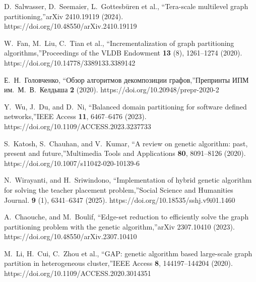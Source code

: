 \documentclass[
11pt,%
tightenlines,%
twoside,%
onecolumn,%
nofloats,%
nobibnotes,%
nofootinbib,%
superscriptaddress,%
noshowpacs,%
centertags]%
{revtex4}
\begin{document}
\begin{thebibliography}{99}
D.~Salwasser, D.~Seemaier, L.~Gottesb\"uren et al., \textquotedblleft Tera-scale multilevel graph partitioning,\textquotedblright arXiv 2410.19119 (2024). https://doi.org/10.48550/arXiv.2410.19119

W.~Fan, M.~Liu, C.~Tian et al., \textquotedblleft Incrementalization of graph partitioning algorithms,\textquotedblright Proceedings of the VLDB Endowment \textbf{13} (8), 1261--1274 (2020). https://doi.org/10.14778/3389133.3389142

Е.~Н.~Головченко, \textquotedblleft Обзор алгоритмов декомпозиции графов,\textquotedblright Препринты ИПМ им.~М.~В.~Келдыша \textbf{2} (2020). https://doi.org/10.20948/prepr-2020-2

Y.~Wu, J.~Du, and D.~Ni, \textquotedblleft Balanced domain partitioning for software defined networks,\textquotedblright IEEE Access \textbf{11}, 6467--6476 (2023). https://doi.org/10.1109/ACCESS.2023.3237733

S.~Katosh, S.~Chauhan, and V.~Kumar, \textquotedblleft A review on genetic algorithm: past, present and future,\textquotedblright Multimedia Tools and Applications \textbf{80}, 8091--8126 (2020). https://doi.org/10.1007/s11042-020-10139-6

N.~Wirayanti, and H.~Sriwindono, \textquotedblleft Implementation of hybrid genetic algorithm for solving the teacher placement problem,\textquotedblright Social Science and Humanities Journal. \textbf{9} (1), 6341--6347 (2025). https://doi.org/10.18535/sshj.v9i01.1460

A.~Chaouche, and M.~Boulif, \textquotedblleft Edge-set reduction to efficiently solve the graph partitioning problem with the genetic algorithm,\textquotedblright arXiv 2307.10410 (2023). https://doi.org/10.48550/arXiv.2307.10410

M.~Li, H.~Cui, C.~Zhou et al., \textquotedblleft GAP: genetic algorithm based large-scale graph partition in heterogeneous cluster,\textquotedblright IEEE Access \textbf{8}, 144197--144204 (2020). https://doi.org/10.1109/ACCESS.2020.3014351

\end{thebibliography}
\end{document}
